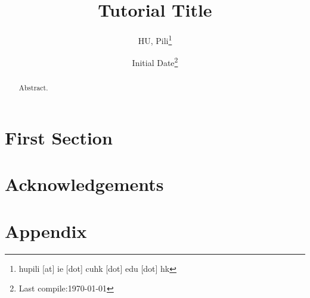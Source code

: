 


\author{HU, Pili\thanks{hupili [at] ie [dot] cuhk [dot] edu [dot] hk}}

\title{Tutorial Title}
\date{Initial Date\thanks{Last compile:\today}}



\maketitle
\begin{abstract}
	Abstract. 
\end{abstract}

\pagebreak
\setcounter{tocdepth}{2}
\tableofcontents
\pagebreak



\section{First Section}






\section*{Acknowledgements}




\section*{Appendix}



